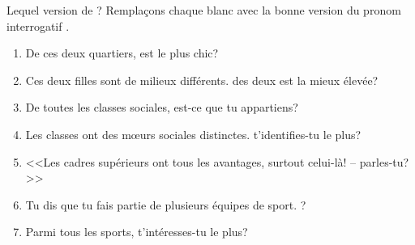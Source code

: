 \begin{frame}{Lequel version de ?}
  Remplaçons chaque blanc avec la bonne version du pronom interrogatif .
  \begin{enumerate}
    \item De ces deux quartiers, \underline{} est le plus chic?
    \item Ces deux filles sont de milieux différents. \underline{} des deux est la mieux élevée?
    \item De toutes les classes sociales, \underline{} est-ce que tu appartiens?
    \item Les classes ont des mœurs sociales distinctes. \underline{} t'identifies-tu le plus?
    \item {}<<Les cadres supérieurs ont tous les avantages, surtout celui-là! -- \underline{} parles-tu?>>
    \item Tu dis que tu fais partie de plusieurs équipes de sport. \underline{}?
    \item Parmi tous les sports, \underline{} t'intéresses-tu le plus?
  \end{enumerate}
\end{frame}